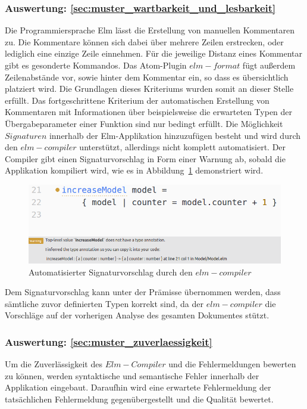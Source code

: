 \subsubsection{Auswertung: \ref{sec:muster_wartbarkeit_und_lesbarkeit} }
Die Programmiersprache Elm lässt die Erstellung von manuellen Kommentaren zu. Die Kommentare können sich dabei über mehrere Zeilen erstrecken, oder lediglich eine einzige Zeile einnehmen. Für die jeweilige Distanz eines Kommentar gibt es gesonderte Kommandos. Das Atom-Plugin $elm-format$ fügt außerdem Zeilenabstände vor, sowie hinter dem Kommentar ein, so dass es übersichtlich platziert wird. Die Grundlagen dieses Kriteriums wurden somit an dieser Stelle erfüllt. Das fortgeschrittene Kriterium der automatischen Erstellung von Kommentaren mit Informationen über beispielsweise die erwarteten Typen der Übergabeparameter einer Funktion sind nur bedingt erfüllt. Die Möglichkeit $Signaturen$ innerhalb der Elm-Applikation hinzuzufügen besteht und wird durch den $elm-compiler$ unterstützt, allerdings nicht komplett automatisiert. Der Compiler gibt einen Signaturvorschlag in Form einer Warnung ab, sobald die Applikation kompiliert wird, wie es in Abbildung~\ref{fig:compiler-signature-suggestion} demonstriert wird.
\begin{figure}[h]
\centering
\includegraphics[scale=0.52]{img/compiler_sig_suggestion.png}
\caption{Automatisierter Signaturvorschlag durch den $elm-compiler$}\label{fig:compiler-signature-suggestion}
\end{figure}
Dem Signaturvorschlag kann unter der Prämisse übernommen werden, dass sämtliche zuvor definierten Typen korrekt sind, da der $elm-compiler$ die Vorschläge auf der vorherigen Analyse des gesamten Dokumentes stützt.

\subsubsection{Auswertung: \ref{sec:muster_zuverlaessigkeit} }
Um die Zuverlässigkeit des $Elm-Compiler$ und die Fehlermeldungen bewerten zu können, werden syntaktische und semantische Fehler innerhalb der Applikation eingebaut. Daraufhin wird eine erwartete Fehlermeldung der tatsächlichen Fehlermeldung gegenübergestellt und die Qualität bewertet.

